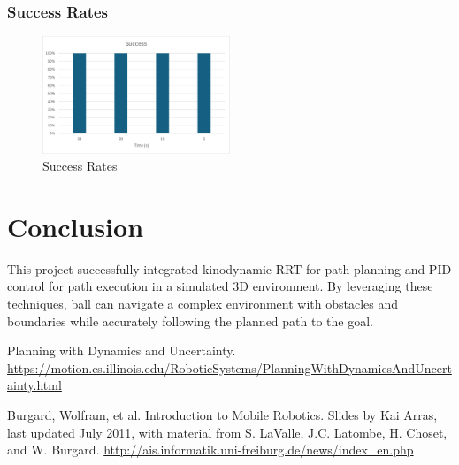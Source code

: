 \documentclass[12pt]{article}
\begin{document}
\subsubsection{Success Rates}
\begin{figure}[h!]
    \centering
    \includegraphics[width=0.5\textwidth]{./images/success.png}
    \caption{Success Rates}
    \label{fig:Succees Rates}
\end{figure}

\section{Conclusion}
This project successfully integrated kinodynamic RRT for path planning and PID control for path execution in a simulated 3D environment. By leveraging these techniques, ball can navigate a complex environment with obstacles and boundaries while accurately following the planned path to the goal.

\begin{thebibliography}{}
\raggedright

Planning with Dynamics and Uncertainty. \href{https://motion.cs.illinois.edu/RoboticSystems/PlanningWithDynamicsAndUncertainty.html}
{https://motion.cs.illinois.edu/RoboticSystems/PlanningWithDynamicsAndUncertainty.html}

Burgard, Wolfram, et al. Introduction to Mobile Robotics. Slides by Kai Arras, last updated July 2011, with material from S. LaValle, J.C. Latombe, H. Choset, and W. Burgard. \href{http://ais.informatik.uni-freiburg.de/news/index_en.php}{http://ais.informatik.uni-freiburg.de/news/index\_en.php}


\end{thebibliography}
\end{document}
